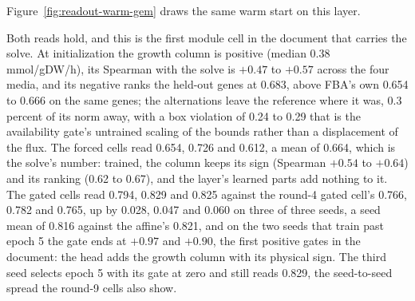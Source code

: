 Figure~\ref{fig:readout-warm-gem} draws the same warm start on this layer.





Both reads hold, and this is the first module cell in the document that carries the
solve. At initialization the growth column is positive (median 0.38 mmol/gDW/h), its
Spearman with the solve is $+0.47$ to $+0.57$ across the four media, and its negative
ranks the held-out genes at 0.683, above FBA's own 0.654 to 0.666 on the same genes; the
alternations leave the reference where it was, 0.3 percent of its norm away, with a
box violation of 0.24 to 0.29 that is the availability gate's untrained scaling of the
bounds rather than a displacement of the flux. The forced cells read 0.654, 0.726 and
0.612, a mean of 0.664, which is the solve's number: trained, the column keeps its sign
(Spearman $+0.54$ to $+0.64$) and its ranking (0.62 to 0.67), and the layer's learned
parts add nothing to it. The gated cells read 0.794, 0.829 and 0.825 against the
round-4 gated cell's 0.766, 0.782 and 0.765, up by 0.028, 0.047 and 0.060 on three of
three seeds, a seed mean of 0.816 against the affine's 0.821, and on the two seeds that
train past epoch 5 the gate ends at $+0.97$ and $+0.90$, the first positive gates in the
document: the head adds the growth column with its physical sign. The third seed selects
epoch 5 with its gate at zero and still reads 0.829, the seed-to-seed spread the round-9
cells also show.

